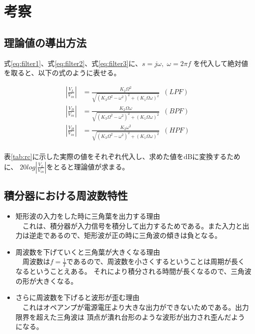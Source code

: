 \documentclass[11pt,a4j]{jsarticle}
\begin{document}
\section{考察}
\label{sec:考察}

\subsection{理論値の導出方法}
\label{sub:理論値の導出方法}

式\ref{eq:filter1}、式\ref{eq:filter2}、式\ref{eq:filter3}に、$s=j\omega, \,\, \omega=2\pi f$
を代入して絶対値を取ると、以下の式のように表せる。

\begin{align}
  \left| \frac{V_L}{V_{in}} \right| &= \frac{K_2\Omega^2}{\sqrt{(K_3\Omega^2-\omega^2)^2 + (K_1\Omega\omega)^2}} \,\,\, (LPF) \\
  \left| \frac{V_B}{V_{in}} \right| &= \frac{K_2\Omega\omega}{\sqrt{(K_3\Omega^2-\omega^2)^2 + (K_1\Omega\omega)^2}} \,\,\, (BPF) \\
  \left| \frac{V_H}{V_{in}} \right| &= \frac{K_2\omega^2}{\sqrt{(K_3\Omega^2-\omega^2)^2 + (K_1\Omega\omega)^2}} \,\,\, (HPF) \\
\end{align}

表\ref{tab:rc}に示した実際の値をそれぞれ代入し、求めた値を$\mathrm{dB}$に変換するために、
$20log\left| \frac{V_L}{V_{in}} \right|$をとると理論値が求まる。

\subsection{積分器における周波数特性}
\label{sub:積分器における周波数特性}

\begin{itemize}
  \item 矩形波の入力をした時に三角葉を出力する理由 \\
  　これは、積分器が入力信号を積分して出力するためである。また入力と出力は逆走であるので、矩形波が正の時に三角波の傾きは負となる。
  \item 周波数を下げていくと三角葉が大きくなる理由 \\
  　周波数は$f=\frac{1}{T}$であるので、周波数を小さくするということは周期が長くなるということえある。
  それにより積分される時間が長くなるので、三角波の形が大きくなる。
  \item さらに周波数を下げると波形が歪む理由 \\
  　これはオペアンプが電源電圧より大きな出力ができないためである。出力限界を超えた三角波は
  頂点が潰れ台形のような波形が出力され歪んだようになる。
\end{itemize}
\end{document}
